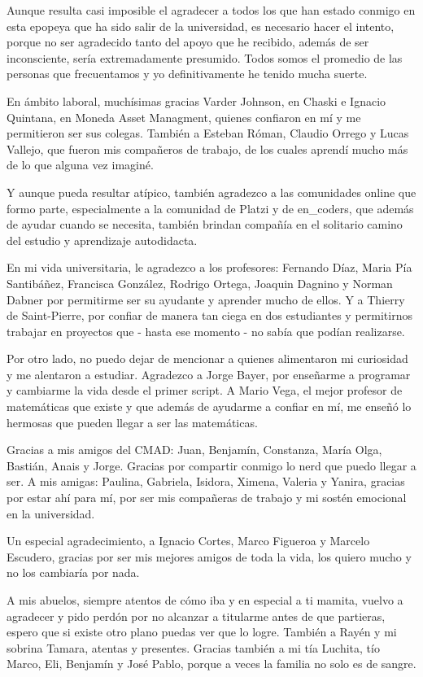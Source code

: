 Aunque resulta casi imposible el agradecer a todos los que han estado conmigo en esta epopeya que ha sido salir de la universidad, es necesario hacer el intento, porque no ser agradecido tanto del apoyo que he recibido, además de ser inconsciente, sería extremadamente presumido. Todos somos el promedio de las personas que frecuentamos y yo definitivamente he tenido mucha suerte.

En ámbito laboral, muchísimas gracias Varder Johnson, en Chaski e Ignacio Quintana, en Moneda Asset Managment, quienes confiaron en mí y me permitieron ser sus colegas.  También a Esteban Róman, Claudio Orrego y Lucas Vallejo, que fueron mis compañeros de trabajo, de los cuales aprendí mucho más de lo que alguna vez imaginé.

Y aunque pueda resultar atípico, también agradezco a las comunidades online que formo parte, especialmente a la comunidad de Platzi y de en\_coders, que además de ayudar cuando se necesita, también brindan compañía en el solitario camino del estudio y aprendizaje autodidacta.  

En mi vida universitaria, le agradezco a los profesores: Fernando Díaz, Maria Pía Santibáñez, Francisca González, Rodrigo Ortega, Joaquin Dagnino y Norman Dabner por permitirme ser su ayudante y aprender mucho de ellos. Y a Thierry de Saint-Pierre, por confiar de manera tan ciega en dos estudiantes y permitirnos trabajar en proyectos que - hasta ese momento - no sabía que podían realizarse. 

Por otro lado, no puedo dejar de mencionar a quienes alimentaron mi curiosidad y me alentaron a estudiar. Agradezco a Jorge Bayer, por enseñarme a programar y cambiarme la vida desde el primer script. A Mario Vega, el mejor profesor de matemáticas que existe y que además de ayudarme a confiar en mí, me enseñó lo hermosas que pueden llegar a ser las matemáticas.

Gracias a mis amigos del CMAD: Juan, Benjamín, Constanza, María Olga, Bastián, Anais y Jorge.  Gracias por compartir conmigo lo nerd que puedo llegar a ser. A mis amigas: Paulina, Gabriela, Isidora, Ximena, Valeria y Yanira, gracias por estar ahí para mí, por ser mis compañeras de trabajo y mi sostén emocional en la universidad. 

Un especial agradecimiento, a Ignacio Cortes, Marco Figueroa y Marcelo Escudero, gracias por ser mis mejores amigos de toda la vida, los quiero mucho y no los cambiaría por nada. 

A mis abuelos, siempre atentos de cómo iba y en especial a ti mamita, vuelvo a agradecer y pido perdón por no alcanzar a titularme antes de que partieras, espero que si existe otro plano puedas ver que lo logre. También a Rayén y mi sobrina Tamara, atentas y presentes. Gracias también a mi tía Luchita, tío Marco, Eli, Benjamín y José Pablo, porque a veces la familia no solo es de sangre.


